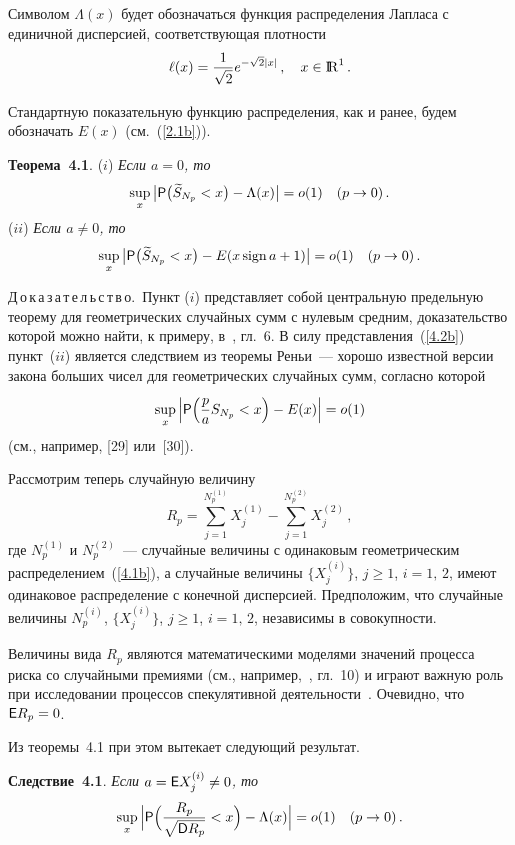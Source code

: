 \begin{multicols}{2}
Символом $\Lambda(x)$ будет обозначаться функция распределения
Лапласа с единичной дисперсией, соответствующая плотности
$$
\ell(x)=\displaystyle\frac{\displaystyle 1\mathstrut}{\displaystyle \sqrt{2}\mathstrut}e^{-\sqrt{2}|x|}\,,\quad x\in{\rm I\hspace{-0.7mm}\rm R}^1\,.
$$

Стандартную показательную функцию распределения, как и ранее,
будем обозначать $E(x)$ (см.~(\ref{2.1b})).

\medskip

\noindent
{\bf Теорема~4.1}. ($i$) {\it Если $a=0$, то}
$$
\sup_x\big|{\sf P}\big(\widetilde
S_{N_p}<x\big)-\Lambda(x)\big|=o(1)\quad (p\to0)\,.
$$
($ii$) {\it Если $a\neq 0$, то}
$$
\sup_x\big|{\sf P}\big(\widetilde
S_{N_p}<x\big)-E(x\,\mathrm{sign}\,a+1)\big|=o(1)\quad
(p\to0)\,.
$$

\smallskip

\noindent
Д\,о\,к\,а\,з\,а\,т\,е\,л\,ь\,с\,т\,в\,о.~Пункт ($i$) представляет собой
центральную предельную теорему для гео\-мет\-ри\-че\-ских случайных сумм с
нулевым средним, доказательство которой можно найти, к примеру, в~\cite{14be},
гл.~6. В силу представления~(\ref{4.2b}) пункт~($ii$) является
следствием из теоремы Реньи~--- хорошо известной версии закона
больших чисел для геометрических случайных сумм, согласно которой
$$
\sup_x\Big|{\sf P}\Big(\displaystyle\frac{\displaystyle p\mathstrut}{\displaystyle a\mathstrut}S_{N_p}<x\Big)-E(x)\Big|=o(1)
$$
(см., например, [29] или~[30]).

\smallskip

Рассмотрим теперь случайную величину
$$
R_p=\sum_{j=1}^{N^{(1)}_p}X^{(1)}_j-\sum_{j=1}^{N^{(2)}_p}X^{(2)}_j\,,
$$
где $N^{(1)}_p$ и $N^{(2)}_p$~--- случайные величины с одинаковым
геометрическим распределением~(\ref{4.1b}), а случайные величины
$\{X^{(i)}_j\}$, $j\ge1$, $i=1,\,2$, имеют одинаковое распределение
с конечной дисперсией. Предположим, что случайные величины
$N^{(i)}_p$, $\{X^{(i)}_j\}$, $j\ge1$, $i=1,\,2$, независимы в
совокупности.

Величины вида $R_p$ являются математическими моделями значений
процесса риска со случайными премиями (см., например,~\cite{12be}, гл.~10)
и играют важную роль при исследовании процессов спекулятивной
деятельности~\cite{1be}. Очевидно, что ${\sf E}R_p=0$.

Из теоремы~4.1 при этом вытекает следующий результат.

\medskip

\noindent
{\bf Следствие~4.1}. {\it Если $a={\sf E}X^{(i)}_j\neq 0$, то}
$$
\sup_x\Big|{\sf P}\Big(\displaystyle\frac{\displaystyle R_p\mathstrut}{\displaystyle \sqrt{{\sf
D}R_p}\mathstrut}<x\Big)-\Lambda(x)\Big|=o(1)\quad (p\to0)\,.
$$

\smallskip


\end{multicols}
